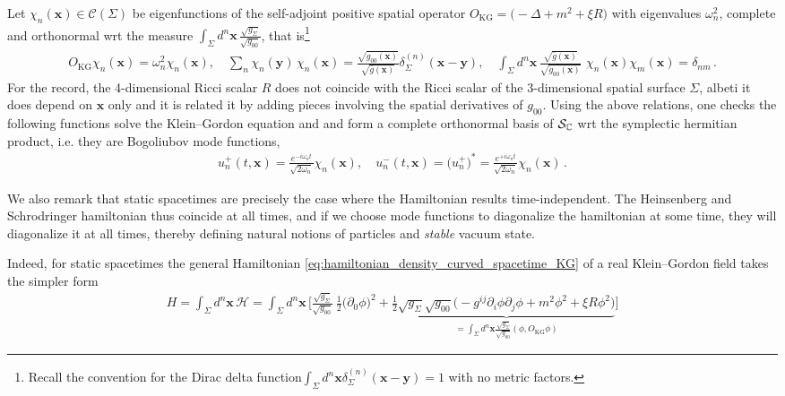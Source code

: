\documentclass[../QFT_main.tex]{subfiles}
\begin{document}
\begin{mytheorem}
Let $\chi_n(\mathbf{x})\in \mathcal{C}(\Sigma)$ be eigenfunctions of the self-adjoint positive spatial operator $O_{\mathrm{KG}}=\big(-\Delta + m^2 + \xi R\big)$ with eigenvalues $\omega_n^2$, complete and orthonormal wrt the measure $\int_\Sigma\!\!d^n\mathbf{x}\, \tfrac{\sqrt{g_\Sigma}}{\sqrt{g_{00}}}$, that is\footnote{Recall the convention for the Dirac delta function$\int_\Sigma\!\!\! d^n\mathbf{x}\delta^{(n)}_{\Sigma}(\mathbf{x}-\mathbf{y})=1$ with no metric factors.}
{\small\begin{align}\label{eq:mode_functions_static_spacetime_properties}
    O_{\mathrm{KG}} \chi_n(\mathbf{x}) = \omega_n^2 \chi_n(\mathbf{x}),\quad
  \sum_n\chi_n(\mathbf{y})\, \chi_n(\mathbf{x}) = \tfrac{\sqrt{g_{00}(\mathbf{x})}}{\sqrt{\bar{g}(\mathbf{x})}} \delta^{(n)}_{\Sigma}(\mathbf{x}-\mathbf{y}), \quad
  \int_\Sigma d^n\mathbf{x}\, \tfrac{\sqrt{\bar{g}(\mathbf{x})}}{\sqrt{g_{00}(\mathbf{x})}}\,\, \chi_n(\mathbf{x}) \chi_m(\mathbf{x}) = \delta_{nm}\,.
\end{align}}
{\color{red}
For the record, the 4-dimensional Ricci scalar $R$ does not coincide with the Ricci scalar of the 3-dimensional spatial surface $\Sigma$, albeti it does depend on $\mathbf{x}$ only and it is related it by adding pieces involving the spatial derivatives of $g_{00}$.}
Using the above relations, one checks the following functions solve the Klein--Gordon equation and and form a complete orthonormal basis of $\mathcal{S}_{\mathbb{C}}$ wrt the symplectic hermitian product, i.e. they are Bogoliubov mode functions,
\begin{align}\label{eq:mode_functions_static_spacetime_form}
    u_n^+(t,\mathbf{x}) = \frac{e^{-i\omega_n t}}{\sqrt{2\omega_n}} \chi_n(\mathbf{x}), \quad u_n^-(t,\mathbf{x}) = \big(u_n^+\big)^* = \frac{e^{+i\omega_n t}}{\sqrt{2\omega_n}} \chi_n(\mathbf{x})\,.
\end{align}

%
{\color{red}We also remark that static spacetimes are precisely the case where the Hamiltonian results time-independent. The Heinsenberg and Schrodringer hamiltonian thus coincide at all times, and if we choose mode functions to diagonalize the hamiltonian at some time, they will diagonalize it at all times, thereby defining natural notions of particles and \emph{stable} vacuum state.}

Indeed, for static spacetimes the general Hamiltonian \eqref{eq:hamiltonian_density_curved_spacetime_KG} of a real Klein--Gordon field takes the simpler form
{\small\begin{align}
    H= \int_\Sigma\!\! d^n\mathbf{x}\,\mathcal{H}=\int_\Sigma\!\! d^n\mathbf{x}\, \bigg[\tfrac{\sqrt{g_\Sigma}}{\sqrt{g_{00}}}\, \tfrac12\big(\partial_0 \phi\big)^2 +\tfrac12 \underbrace{\sqrt{g_\Sigma}\sqrt{g_{00}}\big( -g^{ij} \partial_i \phi \partial_j \phi + m^2\phi^2 + \xi R \phi^2\big)}_{{\displaystyle =\int_\Sigma\!\!d^n\mathbf{x}\tfrac{\sqrt{g_\Sigma}}{\sqrt{g_{00}}}(\phi,O_{\mathrm{KG}}\phi)}}\bigg] 
\end{align}}
\vspace{-6mm}


\end{mytheorem}
\end{document}
